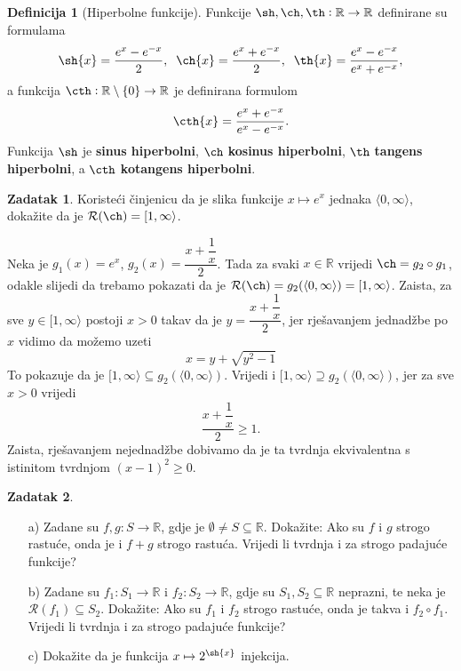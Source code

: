 \documentclass{book}
\renewenvironment{proof}{%
    \vspace{-\parskip}\begin{oldproof}%
    }{%
    \end{oldproof}%
}
\theoremstyle{definition}
\theoremstyle{definition}
\newtheorem{definition}{Definicija}
\newtheorem{exercise}{Zadatak}
\theoremstyle{remark}
\begin{document}
\begin{definition}[Hiperbolne funkcije]
Funkcije $\sh, \ch, \th : \mathbb{R}\to \mathbb{R}$ definirane su formulama
$$\sh{x}=\dfrac{e^x-e^{-x}}{2},\;\;\ch{x}=\dfrac{e^x+e^{-x}}{2},\;\; \th{x}=\dfrac{e^x-e^{-x}}{e^x+e^{-x}},$$
a funkcija $\cth : \mathbb{R}\setminus\{0\}\to \mathbb{R}$ je definirana formulom
$$\cth{x}=\dfrac{e^x+e^{-x}}{e^x-e^{-x}}.$$
Funkcija $\sh$ je \textbf{sinus hiperbolni}, $\ch$ \textbf{kosinus hiperbolni}, $\th$ \textbf{tangens hiperbolni}, a $\cth$ \textbf{kotangens hiperbolni}.
\end{definition}
\begin{exercise}
Koristeći činjenicu da je slika funkcije $x\mapsto e^x$ jednaka $\langle 0, \infty\rangle$, dokažite da je $\mathcal{R}(\ch)=[1,\infty\rangle$.
\end{exercise}
\begin{proof}[Rješenje]
Neka je $g_1(x)=e^x$, $g_2(x)=\dfrac{x+\dfrac{1}{x}}{2}$. Tada za svaki $x\in \mathbb{R}$ vrijedi $\ch=g_2\circ g_1$, odakle slijedi da trebamo pokazati da je $\mathcal{R}(\ch)=g_2(\langle 0, \infty\rangle)=[1, \infty\rangle$.
Zaista, za sve $y\in [1, \infty\rangle$ postoji $x>0$ takav da je $y=\dfrac{x+\dfrac{1}{x}}{2}$, jer rješavanjem jednadžbe po $x$ vidimo da možemo uzeti
$$x=y+\sqrt{y^2-1}$$
To pokazuje da je $[1, \infty\rangle \subseteq g_2(\langle 0, \infty\rangle)$. Vrijedi i $[1, \infty\rangle \supseteq g_2(\langle 0, \infty\rangle)$, jer za sve $x>0$ vrijedi $$\dfrac{x+\dfrac{1}{x}}{2}\geq 1.$$ Zaista, rješavanjem nejednadžbe dobivamo da je ta tvrdnja ekvivalentna s istinitom tvrdnjom $(x-1)^2\geq 0$.
\end{proof}
\begin{exercise} \textbf{}
\begin{itemize}
\item[a)] Zadane su $f, g : S\to \mathbb{R}$, gdje je $\emptyset\neq S\subseteq \mathbb{R}$. Dokažite: Ako su $f$ i $g$ strogo rastuće, onda je i $f+g$ strogo rastuća. Vrijedi li tvrdnja i za strogo padajuće funkcije? 
\item[b)] Zadane su $f_1 : S_1\to \mathbb{R}$ i $f_2 : S_2\to \mathbb{R}$, gdje su $S_1, S_2\subseteq \mathbb{R}$ neprazni, te neka je $\mathcal{R}(f_1)\subseteq S_2$. Dokažite: Ako su $f_1$ i $f_2$ strogo rastuće, onda je takva i $f_2\circ f_1$. Vrijedi li tvrdnja i za strogo padajuće funkcije?
\item[c)] Dokažite da je funkcija $x\mapsto 2^{\sh{x}}$ injekcija.
\end{itemize}
\end{exercise}
\end{document}
